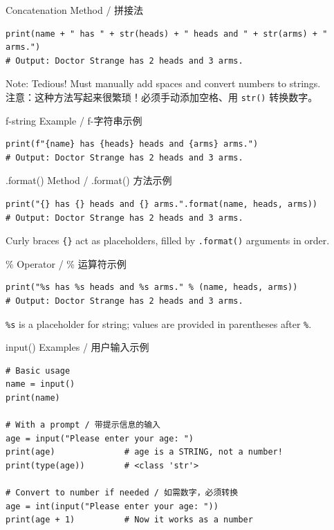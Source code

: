 \documentclass[11pt,a4paper]{report}
\let\oldtexttt\texttt
\renewcommand{\texttt}[1]{\textcolor{mainblue}{\oldtexttt{#1}}}
\begin{document}
\begin{examplebox}{Concatenation Method / 拼接法}
\begin{lstlisting}
print(name + " has " + str(heads) + " heads and " + str(arms) + " arms.")
# Output: Doctor Strange has 2 heads and 3 arms.
\end{lstlisting}
    Note: Tedious! Must manually add spaces and convert numbers to strings. \\
    注意：这种方法写起来很繁琐！必须手动添加空格、用 \texttt{str()} 转换数字。
\end{examplebox}

\begin{examplebox}{f-string Example / f-字符串示例}
\begin{lstlisting}
print(f"{name} has {heads} heads and {arms} arms.")
# Output: Doctor Strange has 2 heads and 3 arms.
\end{lstlisting}
\end{examplebox}

\begin{examplebox}{.format() Method / .format() 方法示例}
\begin{lstlisting}
print("{} has {} heads and {} arms.".format(name, heads, arms))
# Output: Doctor Strange has 2 heads and 3 arms.
\end{lstlisting}
    Curly braces \texttt{\{\}} act as placeholders, filled by \texttt{.format()} arguments in order.
\end{examplebox}

\begin{examplebox}{\% Operator / \% 运算符示例}
\begin{lstlisting}
print("%s has %s heads and %s arms." % (name, heads, arms))
# Output: Doctor Strange has 2 heads and 3 arms.
\end{lstlisting}
    \texttt{\%s} is a placeholder for string; values are provided in parentheses after \texttt{\%}.
\end{examplebox}

\begin{examplebox}{input() Examples / 用户输入示例}
\begin{lstlisting}
# Basic usage
name = input()
print(name)

# With a prompt / 带提示信息的输入
age = input("Please enter your age: ")
print(age)              # age is a STRING, not a number!
print(type(age))        # <class 'str'>

# Convert to number if needed / 如需数字，必须转换
age = int(input("Please enter your age: "))
print(age + 1)          # Now it works as a number
\end{lstlisting}
\end{examplebox}
\end{document}
